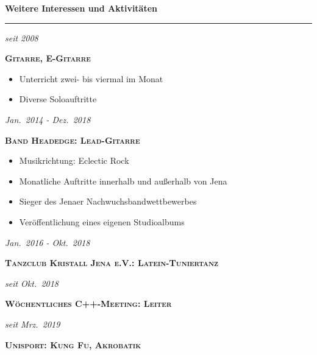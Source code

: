 \documentclass[8pt]{article}
\newcommand{\cvSectionStyle}{%
  \normalfont%
  \Large%
  \color{cvColor}%
  \bfseries%
  \sffamily%
}
\newcommand{\cvTimeStyle}{%
  \normalfont%
  \sffamily%
  \footnotesize%
  \itshape%
}
\newcommand{\cvSection}[1]{%
  \smallskip%
  {%
    \cvSectionStyle #1%
  }\\[-0.5em]
  \rule{\linewidth}{0.8pt}%
  \par%
  \smallskip%
}
\newenvironment{cvItemize}{%
  \begin{itemize}[itemsep=0mm, leftmargin=4mm]
}{%
  \end{itemize}
}
\newenvironment{cvTimeItem}[2]{
  \par
  \begin{minipage}[c]{0.15\linewidth}
    \raggedleft
    \cvTimeStyle #1
  \end{minipage}
  \quad
  \vrule
  \quad
  \begin{minipage}[t]{0.79\linewidth}
    \sffamily\textsc{\color{cvColor} \textbf{#2}}\par
    \normalfont\footnotesize\sffamily\color{cvContentColor}
}{
  \end{minipage}
  \par%
  \vspace{\baselineskip}%
}
\begin{document}
  \cvSection{Weitere Interessen und Aktivitäten}
    \begin{multicols}{2}
      \begin{cvTimeItem}{seit 2008}{Gitarre, E-Gitarre}
        \begin{cvItemize}
          \item Unterricht zwei- bis viermal im Monat
          \item Diverse Soloauftritte
        \end{cvItemize}
      \end{cvTimeItem}
      \begin{cvTimeItem}{Jan.~2014 - Dez.~2018}{Band Headedge: Lead-Gitarre}
        \begin{cvItemize}
          \item Musikrichtung: Eclectic Rock
          \item Monatliche Auftritte innerhalb und außerhalb von Jena
          \item Sieger des Jenaer Nachwuchsbandwettbewerbes
          \item Veröffentlichung eines eigenen Studioalbums
        \end{cvItemize}
      \end{cvTimeItem}
      \begin{cvTimeItem}{Jan.~2016 - Okt.~2018}{Tanzclub Kristall Jena e.V.: Latein-Tuniertanz}
      \end{cvTimeItem}
      \begin{cvTimeItem}{seit Okt.~2018}{Wöchentliches C++-Meeting: Leiter}
      \end{cvTimeItem}
      \begin{cvTimeItem}{seit Mrz.~2019}{Unisport: Kung Fu, Akrobatik}
      \end{cvTimeItem}
    \end{multicols}
\end{document}
